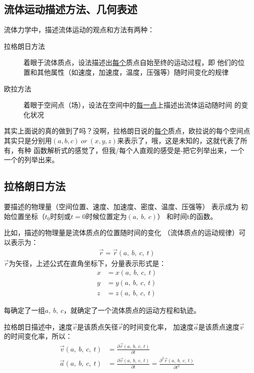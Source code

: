 \documentclass[UTF8,12pt]{article}
\begin{document}
\subsection{流体运动描述方法、几何表述}

流体力学中，描述流体运动的观点和方法有两种：
\begin{description}
    \item[拉格朗日方法] 着眼于流体质点，设法描述出\uline{每个}质点自始至终的运动过程，即
    他们的位置和其他属性（如速度，加速度，温度，压强等）随时间变化的规律
    \item[欧拉方法] 着眼于空间点（场），设法在空间中的\uline{每一点}上描述出流体运动随时间
    的变化状况
\end{description}
其实上面说的真的做到了吗？没啊，拉格朗日说的\uline{每个}质点，欧拉说的每个空间点
其实只是分别用$(a,b,c)~or~(x,y,z)$来表示了，哦，这是未知的，这就代表了所有，有种
函数解析式的感觉了，但我/每个人直观的感受是-把它列举出来，一个一个的列举出来。

\subsection{拉格朗日方法}

要描述的物理量（空间位置、速度、加速度、密度、温度、压强等）
表示成为
初始位置坐标（$t_0$时刻或$t=0$时候位置定为$(a,~b,~c)$）
和时间t的函数。

比如，描述的物理量是流体质点的位置随时间的变化
（流体质点的运动规律）可以表示为：
\begin{align*}
    \vec r = \vec r(a,~b,~c,~t)
\end{align*}
$\vec r$为矢径，上述公式在直角坐标下，分量表示形式是：
\begin{align*}
    x &= x(a,~b,~c,~t)\\
    y &= y(a,~b,~c,~t)\\
    z &= z(a,~b,~c,~t)
\end{align*}

每确定了一组$a,~b,~c$，就确定了一个流体质点的运动方程和轨迹。

拉格朗日描述中，速度$\vec v$是该质点矢径$\vec r$的时间变化率，
加速度$\vec a$是该质点速度$\vec v$的时间变化率，所以：
\begin{align*}
    \vec v(a,~b,~c,~t) &= \frac{\partial \vec r (a,~b,~c,~t)}{\partial t}\\
    \vec a(a,~b,~c,~t) &= \frac{\partial \vec v (a,~b,~c,~t)}{\partial t} = \frac{\partial ^2 \vec r (a,~b,~c,~t)}{\partial t^2}
\end{align*}
\end{document}
